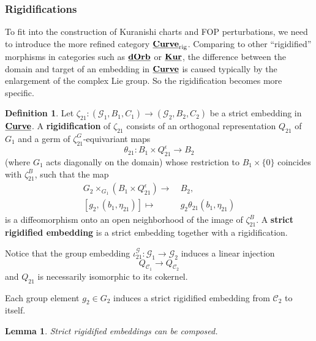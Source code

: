 \documentclass[reqno, 10pt]{amsart}
\numberwithin{equation}{section}
\numberwithin{equation}{section}
\newtheorem{lemma}[thm]{Lemma}
\theoremstyle{definition}
\newtheorem{defn}[thm]{Definition}
\theoremstyle{remark}
\newcommand{\beqn}{\begin{equation*}}
\newcommand{\eeqn}{\end{equation*}}
\newcommand{\mc}{\mathcal}
\newcommand{\uds}[1]{\underline{\smash{#1}}}
\begin{document}
\subsubsection{Rigidifications}

To fit into the construction of Kuranishi charts and FOP perturbations, we need to introduce the more refined category $\uds{\bf Curve}_{\rm rig}$. Comparing to other ``rigidified'' morphisms in categories such as $\uds{\bf dOrb}$ or $\uds{\bf Kur}$, the difference between the domain and target of an embedding in $\uds{\bf Curve}$ is caused typically by the enlargement of the complex Lie group. So the rigidification becomes more specific.

\begin{defn}\label{defn_curve_rigidification}
Let $\zeta_{21}: ({\mc G}_1, B_1, C_1) \to ({\mc G}_2, B_2, C_2)$ be a strict embedding in $\uds{\bf Curve}$. A {\bf rigidification} of $\zeta_{21}$ consists of an orthogonal representation $Q_{21}$ of $G_1$ and
a germ of $\zeta_{21}^G$-equivariant maps
\beqn
\theta_{21}: B_1 \times Q_{21}^\epsilon \to B_2
\eeqn
(where $G_1$ acts diagonally on the domain) whose restriction to $B_1 \times \{0\}$ coincides with $\zeta_{21}^B$, such that the map
\beqn
\begin{split}
G_2 \times_{G_1} ( B_1 \times Q_{21}^\epsilon) \to &\ B_2,\\
[g_2, (b_1, \eta_{21})] \mapsto &\ g_2 \theta_{21} (b_1, \eta_{21})
\end{split}
\eeqn
is a diffeomorphism onto an open neighborhood of the image of $\zeta_{21}^B$. A {\bf strict rigidified embedding} is a strict embedding together with a rigidification.
\end{defn}

Notice that the group embedding $\iota_{21}^{\mc G}: {\mc G}_1 \to {\mc G}_2$ induces a linear injection
\beqn
Q_{{\mc C}_1} \to Q_{{\mc C}_2}
\eeqn
and $Q_{21}$ is necessarily isomorphic to its cokernel.



Each group element $g_2\in G_2$ induces a strict rigidified embedding from ${\mc C}_2$ to itself.

\begin{lemma}
Strict rigidified embeddings can be composed.
\end{lemma}
\end{document}
